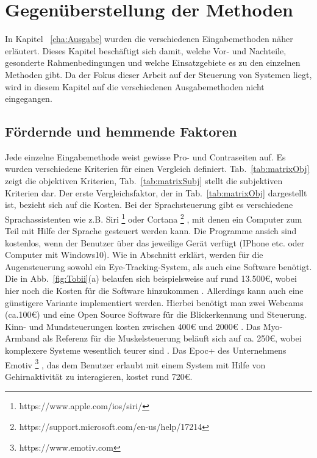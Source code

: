 \chapter{Gegenüberstellung der Methoden}
\label{cha:Vergleich}

In Kapitel ~\ref{cha:Ausgabe} wurden die verschiedenen Eingabemethoden näher erläutert. Dieses Kapitel beschäftigt sich damit, welche Vor- und Nachteile, gesonderte Rahmenbedingungen und welche Einsatzgebiete es zu den einzelnen Methoden gibt. Da der Fokus dieser Arbeit auf der Steuerung von Systemen liegt, wird in diesem Kapitel auf die verschiedenen Ausgabemethoden nicht eingegangen.

\section{Fördernde und hemmende Faktoren}
%
Jede einzelne Eingabemethode weist gewisse Pro- und Contraseiten auf. Es wurden verschiedene Kriterien für einen Vergleich definiert. Tab.~\ref{tab:matrixObj} zeigt die objektiven Kriterien, Tab.~\ref{tab:matrixSubj} stellt die subjektiven Kriterien dar.
\newline \newline
Der erste Vergleichsfaktor, der in Tab.~\ref{tab:matrixObj} dargestellt ist, bezieht sich auf die Kosten. Bei der Sprachsteuerung gibt es verschiedene Sprachassistenten wie z.B. Siri%
\footnote{https://www.apple.com/ios/siri/}
%
 oder Cortana%
\footnote{https://support.microsoft.com/en-us/help/17214}
%
 , mit denen ein Computer zum Teil mit Hilfe der Sprache gesteuert werden kann. Die Programme ansich sind kostenlos, wenn der Benutzer über das jeweilige Gerät verfügt (IPhone etc. oder Computer mit Windows10).
Wie in Abschnitt \label{cha:Augensteuerung} erklärt, werden für die Augensteuerung sowohl ein Eye-Tracking-System, als auch eine Software benötigt. Die in Abb.~\ref{fig:Tobii}(a) belaufen sich beispielsweise auf rund 13.500€, wobei hier noch die Kosten für die Software hinzukommen \cite{TobiiCosts}. Allerdings kann auch eine günstigere Variante implementiert werden. Hierbei benötigt man zwei Webcams (ca.100€) und eine Open Source Software für die Blickerkennung und Steuerung. Kinn- und Mundsteuerungen kosten zwischen 400€ und 2000€ \cite{SENSORY} \cite{INTEGRA}. Das Myo-Armband als Referenz für die Muskelsteuerung beläuft sich auf ca. 250€, wobei komplexere Systeme wesentlich teurer sind \cite{myoBand}. Das Epoc+ des Unternehmens Emotiv%
\footnote{https://www.emotiv.com}
%
, das dem Benutzer erlaubt mit einem System mit Hilfe von Gehirnaktivität zu interagieren, kostet rund 720€.
